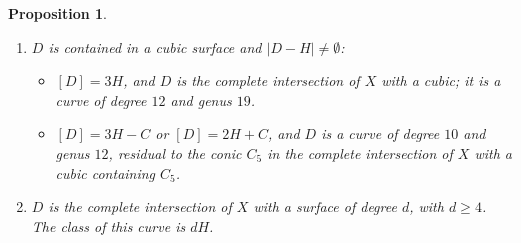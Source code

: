 \documentclass[12pt,reqno]{amsart}
\theoremstyle{plain}
\newtheorem{prop}[theorem]{Proposition}
\theoremstyle{definition}
\theoremstyle{remark}
\theoremstyle{definition}
\begin{document}
\begin{prop}
\begin{enumerate}[label=(\roman*)]
    \item $D$ is contained in a cubic surface and $|D-H|\neq\emptyset$:
    \begin{itemize}
        \item[(a)] $[D]=3H$, and $D$ is the complete intersection of $X$ with a cubic; it is a curve of degree $12$ and genus $19$.
        \item[(b)] $[D]=3H-C$ or $[D]=2H+C$, and $D$ is a curve of degree $10$ and genus $12$, residual to the conic $C_{5}$ in the complete intersection of $X$ with a cubic containing $C_{5}$.
    \end{itemize}

    \item $D$ is the complete intersection of $X$ with a surface of degree $d$, with $d\geq4$. The class of this curve is $dH$.
\end{enumerate}
\end{prop}
\end{document}
